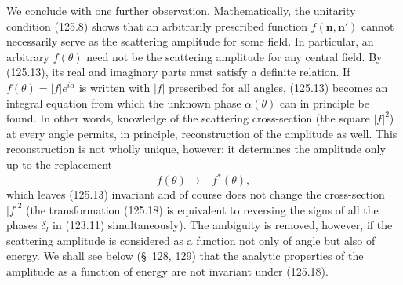We conclude with one further observation. Mathematically, the unitarity
condition (125.8) shows that an arbitrarily prescribed function
$f(\mathbf n,\mathbf n')$ cannot necessarily serve as the scattering
amplitude for some field. In particular, an arbitrary $f(\theta)$ need not be
the scattering amplitude for any central field. By (125.13), its real and
imaginary parts must satisfy a definite relation. If
$f(\theta)=|f|e^{i\alpha}$ is written with $|f|$ prescribed for all angles,
(125.13) becomes an integral equation from which the unknown phase
$\alpha(\theta)$ can in principle be found. In other words, knowledge of the
scattering cross-section (the square $|f|^2$) at every angle permits, in
principle, reconstruction of the amplitude as well. This reconstruction is
not wholly unique, however: it determines the amplitude only up to the
replacement
\begin{equation}
 f(\theta)\to-f^*(\theta),
 \tag{125.18}
\end{equation}
which leaves (125.13) invariant and of course does not change the
cross-section $|f|^2$ (the transformation (125.18) is equivalent to reversing
the signs of all the phases $\delta_l$ in (123.11) simultaneously). The
ambiguity is removed, however, if the scattering amplitude is considered as a
function not only of angle but also of energy. We shall see below (\S~128,
129) that the analytic properties of the amplitude as a function of energy
are not invariant under (125.18).
